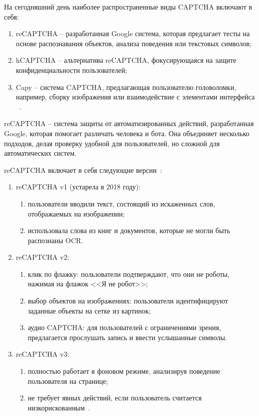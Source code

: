 На сегодняшний день наиболее распространенные виды CAPTCHA включают в себя:

\begin{enumerate}
    \item reCAPTCHA -- разработанная Google система, которая предлагает тесты 
    на основе распознавания объектов, анализа поведения или текстовых символов;
    \item hCAPTCHA -- альтернатива reCAPTCHA, фокусирующаяся на защите 
    конфиденциальности пользователей;
    \item Capy -- система CAPTCHA, предлагающая пользователю головоломки, 
    например, сборку изображения или взаимодействие с элементами интерфейса
    ~\cite{tproger}.
\end{enumerate}

reCAPTCHA -- система защиты от автоматизированных действий, разработанная Google, 
которая помогает различать человека и бота. Она объединяет несколько подходов, 
делая проверку удобной для пользователей, но сложной для автоматических систем.

reCAPTCHA включает в себя следующие версии~\cite{recaptchaversions}:

\begin{enumerate}
    \item reCAPTCHA v1 (устарела в 2018 году):
    \begin{enumerate}
        \item пользователи вводили текст, состоящий из искаженных слов, 
        отображаемых на изображении;
        \item использовала слова из книг и документов, которые не могли быть 
        распознаны OCR.
    \end{enumerate}
    \item reCAPTCHA v2:
    \begin{enumerate}
        \item клик по флажку: пользователи подтверждают, что они не роботы, 
        нажимая на флажок <<Я не робот>>;
        \item выбор объектов на изображениях: пользователи идентифицируют 
        заданные объекты на сетке из картинок;
        \item аудио CAPTCHA: для пользователей с ограничениями зрения, 
        предлагается прослушать запись и ввести услышанные символы.
    \end{enumerate}
    \item reCAPTCHA v3:
    \begin{enumerate}
        \item полностью работает в фоновом режиме, анализируя поведение 
        пользователя на странице;
        \item не требует явных действий, если пользователь считается 
        низкорискованным~\cite{recaptchaversions}.
    \end{enumerate}
\end{enumerate}

